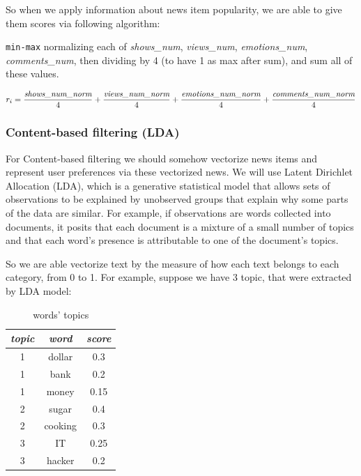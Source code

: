 \documentclass{article}
\begin{document}
So when we apply information about news item popularity, we are able to give them scores via following algorithm:

\texttt{min-max} normalizing each of \emph{shows\_num}, \emph{views\_num}, \emph{emotions\_num}, \emph{comments\_num}, then dividing by 4 (to have 1 as max after sum), and sum all of these values.

\begin{equation}
    r_i = \frac{\emph{shows\_num\_norm}}{4} + \frac{\emph{views\_num\_norm}}{4} + \frac{\emph{emotions\_num\_norm}}{4} + \frac{\emph{comments\_num\_norm}}{4} 
\end{equation}


\subsubsection{Content-based filtering (LDA)}

For Content-based filtering we should somehow vectorize news items and represent user preferences via these vectorized news. We will use Latent Dirichlet Allocation (LDA), which is a generative statistical model that allows sets of observations to be explained by unobserved groups that explain why some parts of the data are similar. For example, if observations are words collected into documents, it posits that each document is a mixture of a small number of topics and that each word's presence is attributable to one of the document's topics.

So we are able vectorize text by the measure of how each text belongs to each category, from 0 to 1.
For example, suppose we have 3 topic, that were extracted by LDA model:

\begin{table}[h]
\centering
\begin{tabular}{ccc}
    \toprule
\textit{topic} & \textit{word} & \textit{score} \\
    \midrule
1 & dollar & 0.3 \\
1 & bank & 0.2 \\
1 & money & 0.15 \\
2 & sugar & 0.4 \\
2 & cooking & 0.3 \\
3 & IT & 0.25 \\
3 & hacker & 0.2 \\
\bottomrule
\end{tabular}%
\caption{words' topics}
\label{tab:words_topics}
\end{table}
\end{document}
